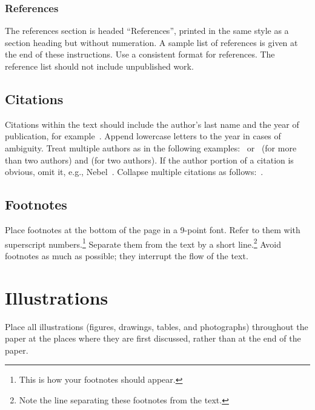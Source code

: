 \documentclass{article}
\begin{document}
\subsubsection{References}

The references section is headed ``References'', printed in the same
style as a section heading but without numeration. A sample list of
references is given at the end of these instructions. Use a consistent
format for references. The reference list should not include unpublished
work.

\subsection{Citations}

Citations within the text should include the author's last name and
the year of publication, for example~\cite{gottlob:nonmon}.  Append
lowercase letters to the year in cases of ambiguity.  Treat multiple
authors as in the following examples:~\cite{abelson-et-al:scheme}
or~\cite{bgf:Lixto} (for more than two authors) and
\cite{brachman-schmolze:kl-one} (for two authors).  If the author
portion of a citation is obvious, omit it, e.g.,
Nebel~.  Collapse multiple citations as
follows:~\cite{gls:hypertrees,levesque:functional-foundations}.
\nocite{abelson-et-al:scheme}
\nocite{bgf:Lixto}
\nocite{brachman-schmolze:kl-one}
\nocite{gottlob:nonmon}
\nocite{gls:hypertrees}
\nocite{levesque:functional-foundations}
\nocite{levesque:belief}
\nocite{nebel:jair-2000}

\subsection{Footnotes}

Place footnotes at the bottom of the page in a 9-point font.  Refer to
them with superscript numbers.\footnote{This is how your footnotes
should appear.} Separate them from the text by a short
line.\footnote{Note the line separating these footnotes from the
text.} Avoid footnotes as much as possible; they interrupt the flow of
the text.

\section{Illustrations}

Place all illustrations (figures, drawings, tables, and photographs) throughout
the paper at the places where they are first discussed, rather than at the end
of the paper.
\end{document}
